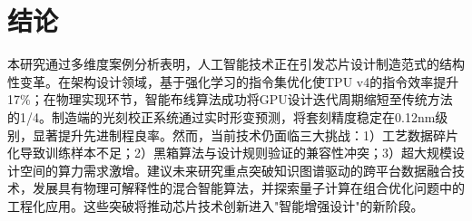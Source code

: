 \documentclass[12pt,hyperref,a4paper,UTF8]{ctexart}
\begin{document}
\section{结论}
本研究通过多维度案例分析表明，人工智能技术正在引发芯片设计制造范式的结构性变革。在架构设计领域，基于强化学习的指令集优化使TPU v4的指令效率提升17\%；在物理实现环节，智能布线算法成功将GPU设计迭代周期缩短至传统方法的1/4。制造端的光刻校正系统通过实时形变预测，将套刻精度稳定在0.12nm级别，显著提升先进制程良率。然而，当前技术仍面临三大挑战：1）工艺数据碎片化导致训练样本不足；2）黑箱算法与设计规则验证的兼容性冲突；3）超大规模设计空间的算力需求激增。建议未来研究重点突破知识图谱驱动的跨平台数据融合技术，发展具有物理可解释性的混合智能算法，并探索量子计算在组合优化问题中的工程化应用。这些突破将推动芯片技术创新进入"智能增强设计"的新阶段。





\end{document}
